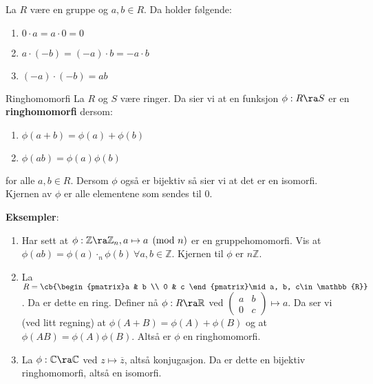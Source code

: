 \begin{theorem*}{18.8}{}
  La $R$ være en gruppe og $a, b \in R$. Da holder følgende:
  \begin{enumerate}
    \item $0\cdot a = a\cdot 0 = 0$
    \item $a\cdot (-b) = (-a)\cdot b = -a\cdot b$
    \item $(-a)\cdot(-b) = ab$
  \end{enumerate}
\end{theorem*}

\begin{definition}{Ringhomomorfi}{}
  La $R$ og $S$ være ringer. Da sier vi at en funksjon $\phi: R \ra S$ er en 
  \textbf{ringhomomorfi} dersom:
  \begin{enumerate}
    \item $\phi(a+b) = \phi(a)+\phi(b)$
    \item $\phi(ab)=\phi(a)\phi(b)$
  \end{enumerate}
  for alle $a, b \in R$. Dersom $\phi$ også er bijektiv så sier vi at det er en isomorfi.
  Kjernen av $\phi$ er alle elementene som sendes til 0.
\end{definition}

\textbf{Eksempler}:
\begin{enumerate}
  \item Har sett at $\phi: \mathbb{Z}\ra \mathbb{Z}_n, a \mapsto a\pmod{n}$ er en gruppehomomorfi.
    Vis at $\phi(ab) = \phi(a) \cdot_n \phi(b)\ \forall a, b\in \mathbb{Z}$. Kjernen til $\phi$ er
    $n \mathbb{Z}$. 
  \item La $R = \cb{\begin{pmatrix}a & b \\ 0 & c \end{pmatrix}\mid a, b, c\in \mathbb{R}}$. Da
    er dette en ring. Definer nå $\phi: R \ra \mathbb{R}$ ved 
    $\begin{pmatrix} a & b \\ 0 & c \end{pmatrix}\mapsto a$. Da ser vi (ved litt regning) at 
    $\phi(A + B) = \phi(A) + \phi(B)$ og at $\phi(AB) = \phi(A)\phi(B)$. Altså er $\phi$ en
    ringhomomorfi.
  \item La $\phi : \mathbb{C} \ra \mathbb{C}$ ved $z \mapsto \overline{z}$, altså konjugasjon.
    Da er dette en bijektiv ringhomomorfi, altså en isomorfi. 
\end{enumerate}

